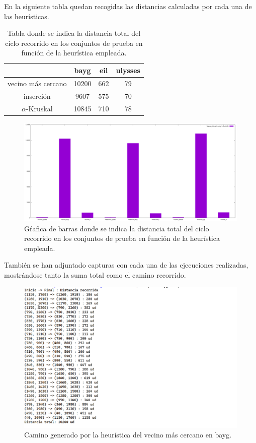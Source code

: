 En la siguiente tabla quedan recogidas las distancias calculadas por cada una de las heurísticas.

\begin{table}[H]
    \centering
    \begin{tabular}{|c|c|c|c|}
      \hline
      & bayg & eil & ulysses \\
      \hline
      vecino más cercano & 10200 & 662 & 79 \\
      \hline
      inserción & 9607 & 575 & 70 \\
      \hline
      $\alpha$-Kruskal & 10845 & 710 & 78 \\
      \hline
    \end{tabular}
    \caption{Tabla donde se indica la distancia total del ciclo recorrido en los conjuntos de prueba
    en función de la heurística empleada.}
\end{table}

\begin{figure}[H]
  \centering
  \includegraphics[scale=0.15]{../src/Comparacion_distancias.pdf}
  \caption{Gŕafica de barras donde se indica la distancia total del ciclo recorrido en los conjuntos de prueba en función de la heurística empleada.}
\end{figure}

También se han adjuntado capturas con cada una de las ejecuciones realizadas, mostrándose tanto la suma
total como el camino recorrido.

\begin{figure}[H]
  \centering
  \includegraphics[scale=0.7]{img/dist-vecinos-bayg.png}
  \caption{Camino generado por la heurística del vecino más cercano en bayg.}
\end{figure}

